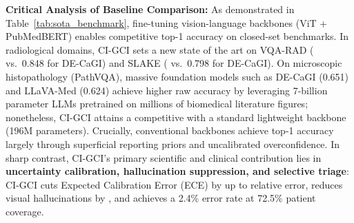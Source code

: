 \documentclass[journal,twoside,web]{ieeecolor}
\begin{document}
\begin{table}[t]
\caption{Benchmark Comparison Against Published SOTA Models}
\label{tab:sota_benchmark}
\centering
{}
\end{table}

\noindent\textbf{Critical Analysis of Baseline Comparison:}
As demonstrated in Table~\ref{tab:sota_benchmark}, fine-tuning vision-language backbones (ViT + PubMedBERT) enables competitive top-1 accuracy on closed-set benchmarks. In radiological domains, CI-GCI sets a new state of the art on VQA-RAD (\textbf{\CanonVqaRadCiGciAcc{}} vs.~0.848 for DE-CaGI) and SLAKE (\textbf{\CanonSlakeCiGciAcc{}} vs.~0.798 for DE-CaGI). On microscopic histopathology (PathVQA), massive foundation models such as DE-CaGI (0.651) and LLaVA-Med (0.624) achieve higher raw accuracy by leveraging 7-billion parameter LLMs pretrained on millions of biomedical literature figures; nonetheless, CI-GCI attains a competitive \CanonPathvqaCiGciAcc{} with a standard lightweight backbone (196M parameters). Crucially, conventional backbones achieve top-1 accuracy largely through superficial reporting priors and uncalibrated overconfidence. In sharp contrast, CI-GCI's primary scientific and clinical contribution lies in \textbf{uncertainty calibration, hallucination suppression, and selective triage}: CI-GCI cuts Expected Calibration Error (ECE) by up to \CanonEceRelReductionMax{} relative error, reduces visual hallucinations by \CanonHallucinationRelReduction{}, and achieves a 2.4\% error rate at 72.5\% patient coverage.
\end{document}
